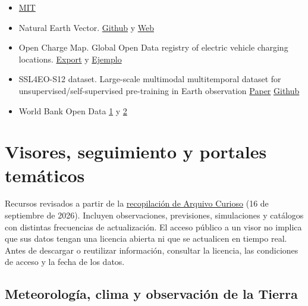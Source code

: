 \documentclass[
  letterpaper,
  DIV=11,
  numbers=noendperiod]{scrartcl}
\begin{document}
\begin{itemize}
\item
  \href{http://web.mit.edu/towtank/www/vivdr/datasets.html}{MIT}
\item
  Natural Earth Vector.
  \href{https://github.com/nvkelso/natural-earth-vector}{Github} y
  \href{https://www.naturalearthdata.com/}{Web}
\item
  Open Charge Map. Global Open Data registry of electric vehicle
  charging locations.
  \href{https://github.com/openchargemap/ocm-export}{Export} y
  \href{https://tech.marksblogg.com/open-charge-map-global-ev-charging-point-dataset.html}{Ejemplo}
\item
  SSL4EO-S12 dataset. Large-scale multimodal multitemporal dataset for
  unsupervised/self-supervised pre-training in Earth observation
  \href{https://arxiv.org/abs/2211.07044}{Paper}
  \href{https://github.com/zhu-xlab/SSL4EO-S12}{Github}
\item
  World Bank Open Data \href{https://data.worldbank.org/}{1} y
  \href{https://datacatalog.worldbank.org/}{2}
\end{itemize}

\section{Visores, seguimiento y portales
temáticos}\label{visores-seguimiento-y-portales-temuxe1ticos}

Recursos revisados a partir de la
\href{https://x.com/arquivocurioso/status/2099780475883553120}{recopilación
de Arquivo Curioso} (16 de septiembre de 2026). Incluyen observaciones,
previsiones, simulaciones y catálogos con distintas frecuencias de
actualización. El acceso público a un visor no implica que sus datos
tengan una licencia abierta ni que se actualicen en tiempo real. Antes
de descargar o reutilizar información, consultar la licencia, las
condiciones de acceso y la fecha de los datos.

\subsection{Meteorología, clima y observación de la
Tierra}\label{meteorologuxeda-clima-y-observaciuxf3n-de-la-tierra}
\end{document}
